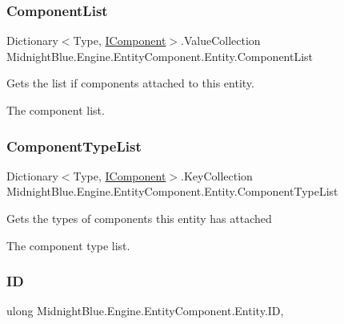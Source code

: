 \subsubsection{\texorpdfstring{Component\+List}{ComponentList}}
{\footnotesize\ttfamily Dictionary$<$Type, \hyperlink{interface_midnight_blue_1_1_engine_1_1_entity_component_1_1_i_component}{I\+Component}$>$.Value\+Collection Midnight\+Blue.\+Engine.\+Entity\+Component.\+Entity.\+Component\+List\hspace{0.3cm}{\ttfamily [get]}}



Gets the list if components attached to this entity. 

The component list.\hypertarget{class_midnight_blue_1_1_engine_1_1_entity_component_1_1_entity_abe7bb823ef9a014142978d52487bc683}{}\label{class_midnight_blue_1_1_engine_1_1_entity_component_1_1_entity_abe7bb823ef9a014142978d52487bc683} 
\subsubsection{\texorpdfstring{Component\+Type\+List}{ComponentTypeList}}
{\footnotesize\ttfamily Dictionary$<$Type, \hyperlink{interface_midnight_blue_1_1_engine_1_1_entity_component_1_1_i_component}{I\+Component}$>$.Key\+Collection Midnight\+Blue.\+Engine.\+Entity\+Component.\+Entity.\+Component\+Type\+List\hspace{0.3cm}{\ttfamily [get]}}



Gets the types of components this entity has attached 

The component type list.\hypertarget{class_midnight_blue_1_1_engine_1_1_entity_component_1_1_entity_a25258a0148ffe34bae09190702056014}{}\label{class_midnight_blue_1_1_engine_1_1_entity_component_1_1_entity_a25258a0148ffe34bae09190702056014} 
\subsubsection{\texorpdfstring{ID}{ID}}
{\footnotesize\ttfamily ulong Midnight\+Blue.\+Engine.\+Entity\+Component.\+Entity.\+ID\hspace{0.3cm}{\ttfamily [get]}, {\ttfamily [set]}}




